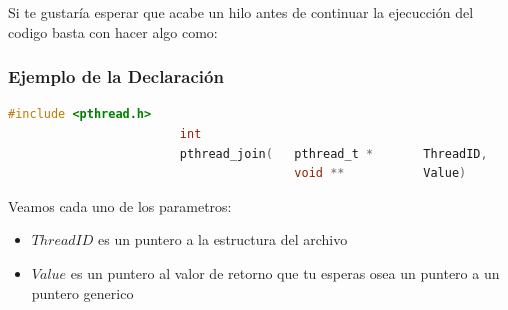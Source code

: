 \documentclass[12pt, fleqn]{report}                             %
\begin{document}
                Si te gustaría esperar que acabe un hilo antes de continuar la ejecucción del
                codigo basta con hacer algo como:

                \subsubsection{Ejemplo de la Declaración}
                    \begin{lstlisting}[language=C, gobble=24]
                        #include <pthread.h>
                        int
                        pthread_join(   pthread_t *       ThreadID,
                                        void **           Value)
                    \end{lstlisting}

                    Veamos cada uno de los parametros:
                    \begin{itemize}
                        \item $ThreadID$ es un puntero a la estructura del archivo
                        \item $Value$ es un puntero al valor de retorno que tu esperas
                        osea un puntero a un puntero generico
                    \end{itemize}
\end{document}
